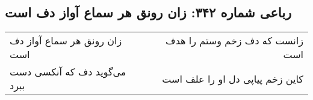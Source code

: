 \begin{center}
\section*{رباعی شماره ۳۴۲: زان رونق هر سماع آواز دف است}
\label{sec:0342}
\begin{longtable}{l p{0.5cm} r}
زان رونق هر سماع آواز دف است
&&
زانست که دف زخم وستم را هدف است
\\
می‌گوید دف که آنکسی دست ببرد
&&
کاین زخم پیاپی دل او را علف است
\\
\end{longtable}
\end{center}
